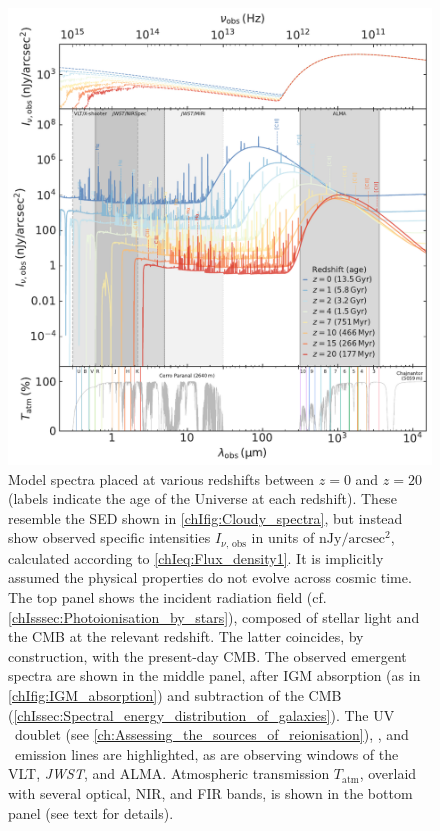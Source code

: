 \begin{figure}
    \centering
    \includegraphics[width=\linewidth]{"Figs/Cloudy_spectra_redshift"}
    \caption[Model spectra placed at various redshifts between $z = 0$ and $z = 20$.]{Model spectra placed at various redshifts between $z = 0$ and $z = 20$ (labels indicate the age of the Universe at each redshift). These resemble the SED shown in \cref{chIfig:Cloudy_spectra}, but instead show observed specific intensities $I_{\nu, \, \text{obs}}$ in units of $\mathrm{nJy/arcsec^2}$, calculated according to \cref{chIeq:Flux_density1}. It is implicitly assumed the physical properties do not evolve across cosmic time. The top panel shows the incident radiation field (cf. \cref{chIsssec:Photoionisation_by_stars}), composed of stellar light and the CMB at the relevant redshift. The latter coincides, by construction, with the present-day CMB. The observed emergent spectra are shown in the middle panel, after IGM absorption (as in \cref{chIfig:IGM_absorption}) and subtraction of the CMB (\cref{chIssec:Spectral_energy_distribution_of_galaxies}). The UV \CIII\ doublet (see \cref{ch:Assessing_the_sources_of_reionisation}), \Halpha, and \CIILam\ emission lines are highlighted, as are observing windows of the VLT, \textit{JWST}, and ALMA. Atmospheric transmission $T_\text{atm}$, overlaid with several optical, NIR, and FIR bands, is shown in the bottom panel (see text for details).}
    \label{chIfig:Cloudy_spectra_redshift}
\end{figure}

